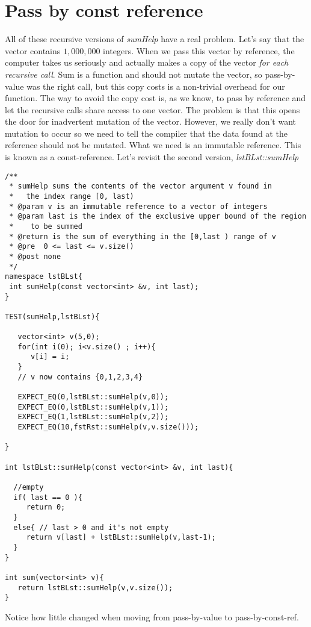 \documentclass[]{tufte-handout}
\begin{document}
\section{Pass by const reference}

All of these recursive versions of \textit{sumHelp} have a real problem. Let's say that the vector contains $1,000,000$ integers.  When we pass this vector by reference, the computer takes us seriously and actually makes a copy of the vector \textit{for each recursive call}. Sum is a function and should not mutate the vector, so pass-by-value was the right call, but this copy costs is a non-trivial overhead for our function. The way to avoid the copy cost is, as we know, to pass by reference and let the recursive calls share access to one vector. The problem is that this opens the door for inadvertent mutation of the vector. However, we really don't want mutation to occur so we need to tell the compiler that the data found at the reference should not be mutated.  What we need is an immutable reference. This is known as a const-reference.  Let's revisit the second version, \textit{lstBLst::sumHelp}
\begin{verbatim}
/**
 * sumHelp sums the contents of the vector argument v found in
 *   the index range [0, last)
 * @param v is an immutable reference to a vector of integers
 * @param last is the index of the exclusive upper bound of the region 
 *    to be summed
 * @return is the sum of everything in the [0,last ) range of v
 * @pre  0 <= last <= v.size()
 * @post none
 */
namespace lstBLst{
 int sumHelp(const vector<int> &v, int last);
} 

TEST(sumHelp,lstBLst){

   vector<int> v(5,0);
   for(int i(0); i<v.size() ; i++){
      v[i] = i;		   
   }
   // v now contains {0,1,2,3,4}
   
   EXPECT_EQ(0,lstBLst::sumHelp(v,0));
   EXPECT_EQ(0,lstBLst::sumHelp(v,1));
   EXPECT_EQ(1,lstBLst::sumHelp(v,2));
   EXPECT_EQ(10,fstRst::sumHelp(v,v.size()));
   
}

int lstBLst::sumHelp(const vector<int> &v, int last){
 
  //empty
  if( last == 0 ){
     return 0;
  }
  else{ // last > 0 and it's not empty
     return v[last] + lstBLst::sumHelp(v,last-1);
  }    
}

int sum(vector<int> v){
   return lstBLst::sumHelp(v,v.size());
}
\end{verbatim}

Notice how little changed when moving from pass-by-value to pass-by-const-ref.  
\end{document}
